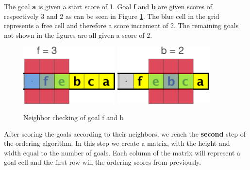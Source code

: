The goal \textbf{a} is given a start score of 1. Goal \textbf{f} and \textbf{b} are given scores of respectively 3 and 2 as can be seen in Figure \ref{fig:grid2}. The blue cell in the grid represents a free cell and therefore a score increment of 2. The remaining goals not shown in the figures are all given a score of 2. 

\begin{figure}[ht!]
\centering
\includegraphics[width=50mm]{graphics/goal_pri_3.png}
\includegraphics[width=50mm]{graphics/goal_pri_2.png}
\caption{Neighbor checking of goal f and b\label{fig:grid2}}
\end{figure}

After scoring the goals according to their neighbors, we reach the \textbf{second} step of the ordering algorithm. In this step we create a matrix, with the height and width equal to the number of goals. Each column of the matrix will represent a goal cell and the first row will the ordering scores from previously. 


